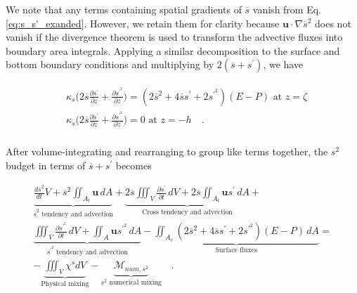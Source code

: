 \documentclass[draft]{agujournal2019}
\begin{document}
We note that any terms containing spatial gradients of $\overline{s}$ vanish from Eq. \ref{eq:s_s'_exanded}. However, we retain them for clarity because $\mathbf{u} \cdot \nabla \overline{s}^2$ does not vanish if the divergence theorem is used to transform the advective fluxes into boundary area integrals. Applying a similar decomposition to the surface and bottom boundary conditions and multiplying by $2(\overline{s}+s^\prime)$,  we have
\begin{linenomath*}
\begin{align} \label{eq:salt_bcs_sprime_expanded}
\begin{split}
    &  \kappa_s \bigg(2\overline{s} \frac{\partial s^\prime}{\partial z}+\frac{\partial s^{\prime^2}}{\partial z}\bigg) = (2\overline{s}^2+4 \overline{s} s^\prime+2s^{\prime^2})(E-P) \,\, \textrm{at} \,\, z = \zeta \\
    &  \kappa_s \bigg(2\overline{s} \frac{\partial s^\prime}{\partial z} +\frac{\partial s^{\prime^2}}{\partial z}\bigg) = 0 \,\, \textrm{at} \,\, z = -h \quad . \\
\end{split}
\end{align}
\end{linenomath*}
After volume-integrating and rearranging to group like terms together, the $s^2$ budget in terms of $\overline{s}+s^\prime$ becomes
\begin{linenomath*}
\begin{equation} \label{eq:differences_vint}
    \begin{split}
        \underbrace{\frac{d \overline{s}^2}{d t} V + \overline{s}^2 \iint_{A_l} \textbf{u} \, dA}_\text{$\overline{s}^2$ tendency and advection}+ \underbrace{2\overline{s} \iiint_V \frac{\partial s^\prime}{\partial t} \, dV+2\overline{s}\iint_{A_l} \textbf{u}s^{\prime} \, dA}_\text{Cross tendency and advection} + \\
        \underbrace{\iiint_V \frac{\partial s^{\prime^2}}{\partial t} \, dV+\iint_A  \textbf{u}s^{\prime^2} \, dA}_\text{$s^{\prime^2}$ tendency and advection}-\underbrace{\iint_{A_{v}} (2\overline{s}^2+4 \overline{s}         s^\prime+2s^{\prime^2})(E-P) \, dA}_\text{Surface fluxes} = \\
        -\underbrace{\iiint_V \chi^s dV}_\text{Physical mixing} - \underbrace{\mathcal{M}_{num, s^2}}_\text{$s^2$ numerical mixing} \quad . 
\end{split}
\end{equation}
\end{linenomath*}
\end{document}
